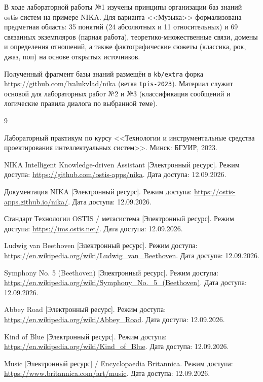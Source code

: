 
В ходе лабораторной работы №1 изучены принципы организации баз знаний ostis-систем на примере NIKA. Для варианта <<Музыка>> формализована предметная область: 35 понятий (24 абсолютных и 11 относительных) и 69 связанных экземпляров (парная работа), теоретико-множественные связи, домены и определения отношений, а также фактографические сюжеты (классика, рок, джаз, поп) на основе открытых источников.

Полученный фрагмент базы знаний размещён в \texttt{kb/extra} форка \url{https://github.com/lvalukvlad/nika} (ветка \texttt{tpis-2023}). Материал служит основой для лабораторных работ №2 и №3 (классификация сообщений и логические правила диалога по выбранной теме).

\begin{thebibliography}{9}

Лабораторный практикум по курсу <<Технологии и инструментальные средства проектирования интеллектуальных систем>>. \mdash Минск: БГУИР, 2023.

NIKA \mdash Intelligent Knowledge-driven Assistant [Электронный ресурс]. \mdash Режим доступа: \url{https://github.com/ostis-apps/nika}. \mdash Дата доступа: 12.09.2026.

Документация NIKA [Электронный ресурс]. \mdash Режим доступа: \url{https://ostis-apps.github.io/nika/}. \mdash Дата доступа: 12.09.2026.

Стандарт Технологии OSTIS / метасистема [Электронный ресурс]. \mdash Режим доступа: \url{https://ims.ostis.net/}. \mdash Дата доступа: 12.09.2026.

Ludwig van Beethoven [Электронный ресурс]. \mdash Режим доступа: \url{https://en.wikipedia.org/wiki/Ludwig_van_Beethoven}. \mdash Дата доступа: 12.09.2026.

Symphony No. 5 (Beethoven) [Электронный ресурс]. \mdash Режим доступа: \url{https://en.wikipedia.org/wiki/Symphony_No._5_(Beethoven)}. \mdash Дата доступа: 12.09.2026.

Abbey Road [Электронный ресурс]. \mdash Режим доступа: \url{https://en.wikipedia.org/wiki/Abbey_Road}. \mdash Дата доступа: 12.09.2026.

Kind of Blue [Электронный ресурс]. \mdash Режим доступа: \url{https://en.wikipedia.org/wiki/Kind_of_Blue}. \mdash Дата доступа: 12.09.2026.

Music [Электронный ресурс] / Encyclopaedia Britannica. \mdash Режим доступа: \url{https://www.britannica.com/art/music}. \mdash Дата доступа: 12.09.2026.

\end{thebibliography}
